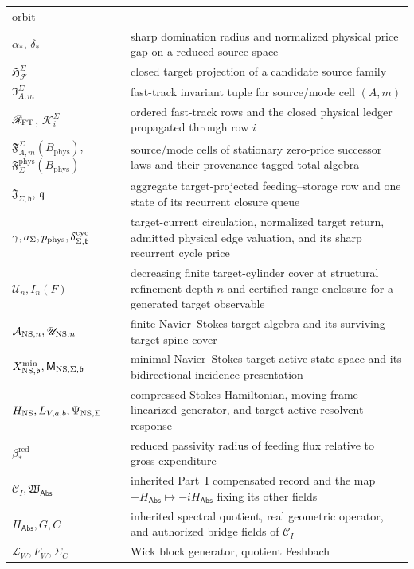 \documentclass[11pt]{article}
\numberwithin{section}{part}
\theoremstyle{plain}
\theoremstyle{definition}
\theoremstyle{remark}
\newcommand{\Abs}{\mathsf{Abs}}
\newcommand{\Phys}{\mathrm{phys}}
\newcommand{\Budget}{B_{\Phys}}
\begin{document}
\begin{longtable}{p{.22\linewidth}p{.68\linewidth}}
orbit\\
\(\alpha_*\), \(\delta_*\) & sharp domination radius and normalized physical
price gap on a reduced source space\\
\(\mathfrak H_{\mathcal F}^\Sigma\) & closed target projection of a candidate
source family\\
\(\mathfrak I_{A,m}^{\Sigma}\) & fast-track invariant tuple for source/mode
cell \((A,m)\)\\
\(\mathscr R_{\rm FT}\), \(\mathcal K_i^\Sigma\) & ordered fast-track rows
and the closed physical ledger propagated through row \(i\)\\
\(\mathfrak F_{A,m}^{\Sigma}(\Budget)\),
\(\mathfrak F_{\Sigma}^{\Phys}(\Budget)\) & source/mode cells of stationary
zero-price successor laws and their provenance-tagged total algebra\\
\(\mathfrak J_{\Sigma,\mathfrak b}\), \(\mathfrak q\) & aggregate
target-projected feeding--storage row and one state of its recurrent closure
queue\\
\(\gamma,a_\Sigma,p_{\Phys},\delta^{\rm cyc}_{\Sigma,\mathfrak b}\) &
target-current circulation, normalized target return, admitted physical edge
valuation, and its sharp recurrent cycle price\\
\(\mathscr U_n,I_n(F)\) & decreasing finite target-cylinder cover at
structural refinement depth \(n\) and certified range enclosure for a
generated target observable\\
\(\mathcal A_{{\rm NS},n},\mathscr U_{{\rm NS},n}\) & finite
Navier--Stokes target algebra and its surviving target-spine cover\\
\(X^{\min}_{{\rm NS},\mathfrak b},
\mathsf M_{{\rm NS},\Sigma,\mathfrak b}\) & minimal Navier--Stokes
target-active state space and its bidirectional incidence presentation\\
\(H_{\rm NS},L_{V,a,b},\Psi_{{\rm NS},\Sigma}\) & compressed Stokes
Hamiltonian, moving-frame linearized generator, and target-active resolvent
response\\
\(\beta_*^{\mathrm{red}}\) & reduced passivity radius of feeding flux relative
to gross expenditure\\
\(\mathscr C_I,\mathfrak W_{\Abs}\) & inherited Part~I compensated record
and the map \(-H_{\Abs}\mapsto-iH_{\Abs}\) fixing its other fields\\
\(H_{\Abs},G,C\) & inherited spectral quotient, real geometric operator,
and authorized bridge fields of \(\mathscr C_I\)\\
\(\mathcal L_W,F_W,\Sigma_C\) & Wick block generator, quotient Feshbach

\end{longtable}
\end{document}
